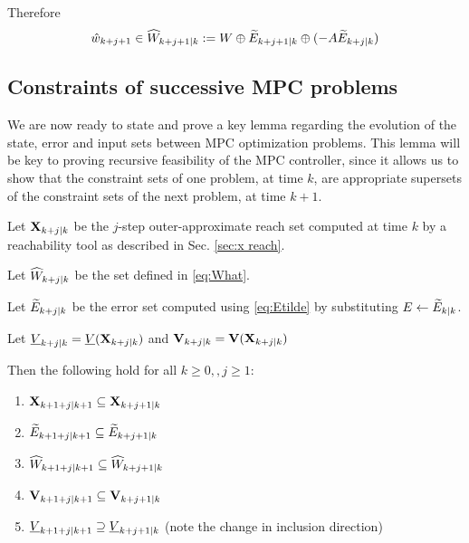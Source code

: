 Therefore 
\begin{equation}
\label{eq:What}
\hat{w}_{k+j+1} \in \widehat{W}_{k+j+1|k} := W \oplus \widetilde{E}_{k+j+1|k} \oplus(-A\widetilde{E}_{k+j|k})
\end{equation}

\subsection{Constraints of successive MPC problems}
\label{sec:inclusions statement}
We are now ready to state and prove a key lemma regarding the evolution of the state, error and input sets between MPC optimization problems. 
This lemma will be key to proving recursive feasibility of the MPC controller, since it allows us to show that the constraint sets of one problem, at time $k$, are appropriate supersets of the constraint sets of the next problem, at time $k+1$. 

\begin{lemma}
	\label{lem:set inclusions}
	Let $\mathbf{X}_{k+j|k}$ be the $j$-step outer-approximate reach set computed at time $k$ by a reachability tool as described in Sec. \ref{sec:x reach}.
	
	Let $\widehat{W}_{k+j|k}$ be the set defined in \eqref{eq:What}.
	
	Let $\widetilde{E}_{k+j|k}$ be the error set computed using \eqref{eq:Etilde} by substituting $E \leftarrow \widetilde{E}_{k|k}$.
	
	Let $\underline{V}_{k+j|k} = \underline{V}(\mathbf{X}_{k+j|k})$ and $\mathbf{V}_{k+j|k} = \mathbf{V}(\mathbf{X}_{k+j|k})$ 

Then the following hold for all $k \geq 0, ,j \geq 1$:
\begin{enumerate}
	\item $\mathbf{X}_{k+1+j|k+1} \subseteq \mathbf{X}_{k+j+1|k}$
	\label{set:X}
	\item $\widetilde{E}_{k+1+j|k+1} \subseteq \widetilde{E}_{k+j+1|k}$
	\label{set:tE}
	\item $\widehat{W}_{k+1+j|k+1} \subseteq \widehat{W}_{k+j+1|k}$
	\label{set:What}
	\item $\mathbf{V}_{k+1+j|k+1} \subseteq \mathbf{V}_{k+j+1|k}$
	\label{set:oaV}
	\item $\underline{V}_{k+1+j|k+1} \supseteq \underline{V}_{k+j+1|k}$ (note the change in inclusion direction)
	\label{set:uaV}		
\end{enumerate} 
\end{lemma} 

